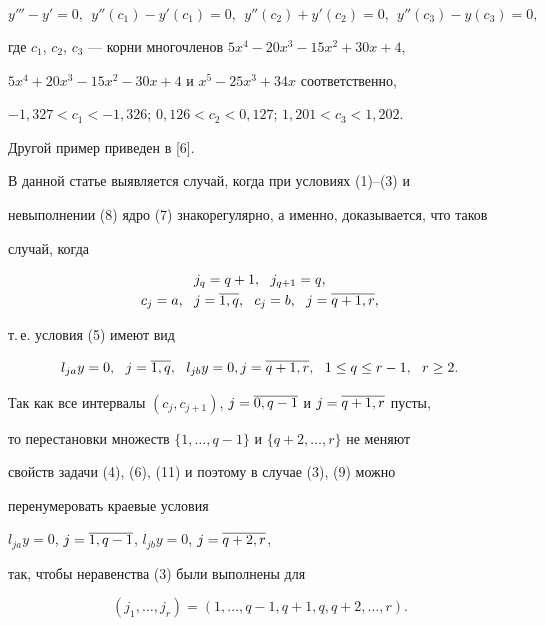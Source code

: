 $$


y'''-y'=0,\ \ y''(c_1)-y'(c_1)=0,\ \ y''(c_2)+y'(c_2)=0,\ \ y''(c_3)-y(c_3)=0,


$$


где $c_1$, $c_2$, $c_3$ --- корни многочленов $5x^4-20x^3-15x^2+30x+4$,


$5x^4+20x^3-15x^2-30x+4$ и $x^5-25x^3+34x$ соответственно,


$-1{,}327<c_1<-1{,}326$; $0{,}126<c_2<0{,}127$; $1{,}201<c_3<1{,}202$.


Другой пример приведен в [6].





В данной статье выявляется случай, когда при условиях (1)--(3) и


невыполнении (8) ядро (7) знакорегулярно, а именно, доказывается, что таков 


случай, когда


\begin{gather}


j_q=q+1,\ \ j_{q+1}=q,\\


c_j=a,\ \ j=\o{1,q},\ \ c_j=b,\ \ j=\o{q+1,r},


\end{gather}


т.\,е. условия (5) имеют вид


\begin{equation}


l_{ja}y=0,\ \ j=\o{1,q},\ \ l_{jb}y=0,j=\o{q+1,r},


\ \ 1\le q\le r-1,\ \  r\ge2.


\end{equation}


Так как все интервалы $(c_j,c_{j+1})$, $j=\overline{0,q-1}$ и $j=\overline{q+1,r}$ пусты, 


то перестановки множеств $\{1,\dotsc,q-1\}$ и $\{q+2,\dotsc,r\}$ не меняют 


свойств задачи (4), (6), (11) и поэтому в случае (3), (9) можно


перенумеровать краевые условия


$l_{ja}y=0$, $j=\overline{1,q-1}$, $l_{jb}y=0$, $j=\overline{q+2,r}$,


так, чтобы неравенства (3) были выполнены для


\begin{equation}


(j_1,\dotsc,j_r)=(1,\dotsc,q-1,q+1,q,q+2,\dotsc,r).


\end{equation}


